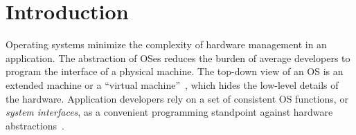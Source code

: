 \chapter{Introduction}
\label{chap:intro}


Operating systems minimize the complexity of hardware management in an application.
The abstraction of OSes reduces the burden of average developers
to program the interface of a physical machine.
The top-down view of an OS is an extended machine or a ``virtual machine''~\cite{tanenbaum19os-textbook,dhamdhere2007os-textbook},
which hides the low-level details of the hardware.
Application developers rely on a set of consistent OS functions, 
or
{\em system interfaces},
as a convenient programming standpoint against hardware abstractions~\cite{ritchie74unix}. 
